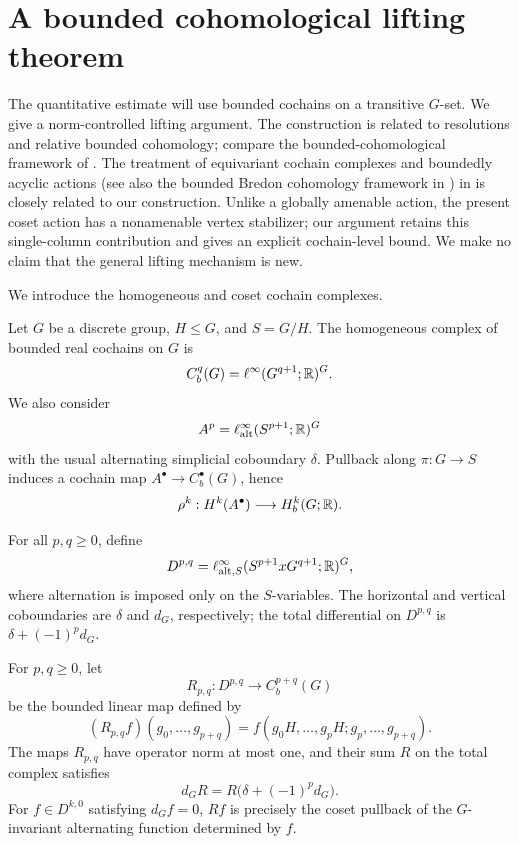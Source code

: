 \section{A bounded cohomological lifting theorem}
\label{sec:bounded}

The quantitative estimate will use bounded cochains on a
transitive $G$-set. We give a norm-controlled lifting argument.
The construction is related to resolutions and relative bounded
cohomology; compare the bounded-cohomological framework of
\cite{Gromov1982,Frigerio2017,Monod2001}. The treatment of equivariant cochain complexes and boundedly acyclic
actions (see also the bounded Bredon cohomology framework in
\cite{Li2023}) in \cite[Corollary~5.15 and Remark~5.17]{LiLohMoraschini2026}
is closely related to our construction. Unlike a globally amenable
action, the present coset action has a nonamenable vertex stabilizer;
our argument retains this single-column contribution and gives an
explicit cochain-level bound. We make no claim that the general
lifting mechanism is new.

We introduce the homogeneous and coset cochain complexes.

Let $G$ be a discrete group, $H\leq G$, and $S=G/H$.
The homogeneous complex of bounded real cochains on $G$ is
\[
 C_b^q(G)=\ell^\infty(G^{q+1};\mathbb{R})^G.
\]
We also consider
\[
 A^p=\ell^\infty_{\mathrm{alt}}(S^{p+1};\mathbb{R})^G
\]
with the usual alternating simplicial coboundary $\delta$.
Pullback along $\pi:G\to S$ induces a cochain map
$A^\bullet\to C_b^\bullet(G)$, hence
\[
 \rho^k:H^k(A^\bullet)\longrightarrow H_b^k(G;\mathbb{R}).
\]

For all $p,q\geq0$, define
\[
 D^{p,q}=
 \ell^\infty_{\mathrm{alt},S}
 (S^{p+1}x G^{q+1};\mathbb{R})^G,
\]
where alternation is imposed only on the $S$-variables.
The horizontal and vertical coboundaries are $\delta$ and $d_G$,
respectively; the total differential on $D^{p,q}$ is
$\delta+(-1)^p d_G$.

\begin{lemma}\label{lem:AW-comparison}
For $p,q\geq0$, let
\[
 R_{p,q}:D^{p,q}\longrightarrow C_b^{p+q}(G)
\]
be the bounded linear map defined by
\[
 (R_{p,q}f)(g_0,\ldots,g_{p+q})
 =f(g_0H,\ldots,g_pH;g_p,\ldots,g_{p+q}).
\]
The maps $R_{p,q}$ have operator norm at most one,
and their sum $R$ on the total complex satisfies
\[
 d_G R=R\bigl(\delta+(-1)^p d_G\bigr).
\]
For $f\in D^{k,0}$ satisfying $d_Gf=0$,
$R f$ is precisely the coset pullback of the
$G$-invariant alternating function determined by $f$.
\end{lemma}


